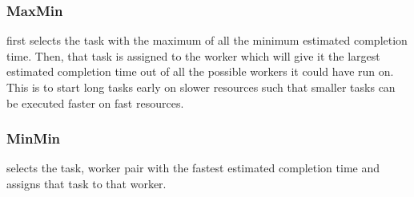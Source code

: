 \subsubsection*{MaxMin}
first selects the task with the maximum of all the minimum estimated completion time.
Then, that task is assigned to the worker which will give it the largest estimated
completion
time out of all the possible workers it could have run on. This is to start long
tasks early on slower resources such that smaller tasks can be executed faster
on fast resources.

\subsubsection*{MinMin}
selects the task, worker pair with the fastest estimated completion time and
assigns that task to that worker.

